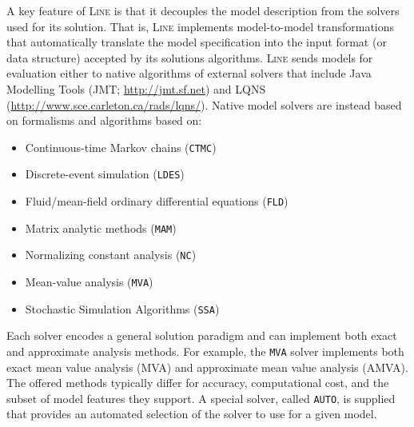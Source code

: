 A key feature of \textsc{Line} is that it decouples the model description from the solvers used for its solution. That is, \textsc{Line} implements model-to-model transformations that automatically translate the model specification into the input format (or data structure) accepted by its solutions algorithms. \textsc{Line} sends models for evaluation either to native algorithms of external solvers that include Java Modelling Tools (JMT; \url{http://jmt.sf.net}) and LQNS (\url{http://www.sce.carleton.ca/rads/lqns/}). Native model solvers are instead based on formalisms and algorithms based on:
\begin{itemize}
\item Continuous-time Markov chains (\texttt{CTMC})
\item Discrete-event simulation (\texttt{LDES})
\item Fluid/mean-field ordinary differential equations (\texttt{FLD})
\item Matrix analytic methods (\texttt{MAM})
\item Normalizing constant analysis (\texttt{NC})
\item Mean-value analysis (\texttt{MVA})
\item Stochastic Simulation Algorithms (\texttt{SSA})
\end{itemize}
Each solver encodes a general solution paradigm and can implement both exact and approximate analysis methods. For example, the \texttt{MVA} solver implements both exact mean value analysis (MVA) and approximate mean value analysis (AMVA). The offered methods typically differ for accuracy, computational cost, and the subset of model features they support. A special solver, called \texttt{AUTO}, is supplied that provides an automated selection of the solver to use for a given model.

